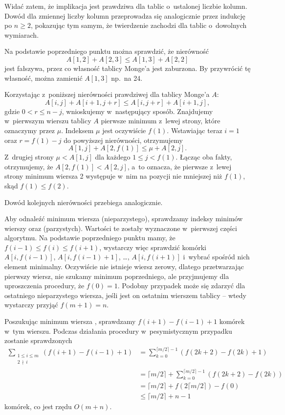 Widać zatem, że implikacja jest prawdziwa dla tablic o~ustalonej liczbie kolumn.
Dowód dla zmiennej liczby kolumn przeprowadza się analogicznie przez indukcję po $n\ge2$, pokazując tym samym, że twierdzenie zachodzi dla tablic o~dowolnych wymiarach.

\subproblem %
Na podstawie poprzedniego punktu można sprawdzić, że nierówność
\[
	A[1,2]+A[2,3] \le A[1,3]+A[2,2]
\]
jest fałszywa, przez co własność tablicy Monge'a jest zaburzona.
By przywrócić tę własność, można zamienić $A[1,3]$ np.\ na 24.

\subproblem %
Korzystając z~poniższej nierówności prawdziwej dla tablicy Monge'a $A$:
\[
	A[i,j]+A[i+1,j+r] \le A[i,j+r]+A[i+1,j],
\]
gdzie $0<r\le n-j$, wnioskujemy w~następujący sposób.
Znajdujemy w~pierwszym wierszu tablicy $A$ pierwsze minimum z~lewej strony, które oznaczymy przez $\mu$.
Indeksem $\mu$ jest oczywiście $f(1)$.
Wstawiając teraz $i=1$ oraz $r=f(1)-j$ do powyższej nierówności, otrzymujemy
\[
	A[1,j]+A[2,f(1)] \le \mu+A[2,j].
\]
Z~drugiej strony $\mu<A[1,j]$ dla każdego $1\le j<f(1)$.
Łącząc oba fakty, otrzymujemy, że $A[2,f(1)]<A[2,j]$, a~to oznacza, że pierwsze z~lewej strony minimum wiersza 2 występuje w~nim na pozycji nie mniejszej niż $f(1)$, skąd $f(1)\le f(2)$.

Dowód kolejnych nierówności przebiega analogicznie.

\subproblem %
Aby odnaleźć minimum wiersza  (nieparzystego), sprawdzamy indeksy minimów wierszy  oraz  (parzystych).
Wartości te zostały wyznaczone w~pierwszej części algorytmu.
Na podstawie poprzedniego punktu mamy, że $f(i-1)\le f(i)\le f(i+1)$, wystarczy więc sprawdzić komórki $A[i,f(i-1)]$, $A[i,f(i-1)+1]$, \dots, $A[i,f(i+1)]$ i~wybrać spośród nich element minimalny.
Oczywiście nie istnieje wiersz zerowy, dlatego przetwarzając pierwszy wiersz, nie szukamy minimum poprzedniego, ale przyjmujemy dla uproszczenia procedury, że $f(0)=1$.
Podobny przypadek może się zdarzyć dla ostatniego nieparzystego wiersza, jeśli jest on ostatnim wierszem tablicy -- wtedy wystarczy przyjąć $f(m+1)=n$.

Poszukując minimum wiersza , sprawdzamy $f(i+1)-f(i-1)+1$ komórek w~tym wierszu.
Podczas działania procedury w~pesymistycznym przypadku zostanie sprawdzonych
\begin{align*}
	\sum_{\substack{1\le i\le m\\2\,\nmid\,i}}(f(i+1)-f(i-1)+1) &= \sum_{k=0}^{\lceil m/2\rceil-1}(f(2k+2)-f(2k)+1) \\[-4mm]
	&= \lceil m/2\rceil+\sum_{k=0}^{\lceil m/2\rceil-1}(f(2k+2)-f(2k)) \\[1mm]
	&= \lceil m/2\rceil+f(2\lceil m/2\rceil)-f(0) \\[2mm]
	&\le \lceil m/2\rceil+n-1
\end{align*}
komórek, co jest rzędu $O(m+n)$.

